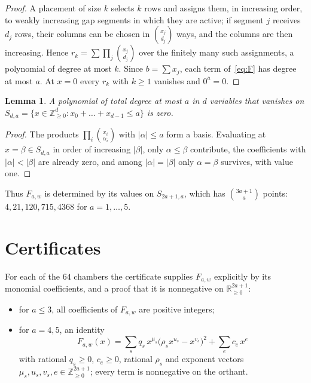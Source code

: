 \documentclass[11pt]{article}
\newtheorem{lemma}[theorem]{Lemma}
\theoremstyle{definition}
\theoremstyle{remark}
\newcommand{\rise}[2]{#1^{\overline{#2}}}
\begin{document}
\begin{proof}
A placement of size $k$ selects $k$ rows and assigns them, in increasing
order, to weakly increasing gap segments in which they are active; if
segment $j$ receives $d_j$ rows, their columns can be chosen in
$\binom{x_j}{d_j}$ ways, and the columns are then increasing. Hence
$r_k=\sum\prod_j\binom{x_j}{d_j}$ over the finitely many such
assignments, a polynomial of degree at most $k$. Since $b=\sum x_j$,
each term of~\eqref{eq:F} has degree at most $a$. At $x=0$ every $r_k$
with $k\ge1$ vanishes and $\rise 0a=0$.
\end{proof}

\begin{lemma}\label{lem:det}
A polynomial of total degree at most $a$ in $d$ variables that vanishes on
$S_{d,a}=\{x\in\mathbb Z_{\ge0}^d:x_0+\dots+x_{d-1}\le a\}$ is zero.
\end{lemma}

\begin{proof}
The products $\prod_i\binom{x_i}{\alpha_i}$ with $|\alpha|\le a$ form a
basis. Evaluating at $x=\beta\in S_{d,a}$ in order of increasing
$|\beta|$, only $\alpha\le\beta$ contribute, the coefficients with
$|\alpha|<|\beta|$ are already zero, and among $|\alpha|=|\beta|$ only
$\alpha=\beta$ survives, with value one.
\end{proof}

Thus $F_{a,w}$ is determined by its values on $S_{2a+1,a}$, which has
$\binom{3a+1}{a}$ points: $4,21,120,715,4368$ for $a=1,\dots,5$.

\section{Certificates}\label{sec:cert}

For each of the $64$ chambers the certificate supplies $F_{a,w}$
explicitly by its monomial coefficients, and a proof that it is
nonnegative on $\mathbb R_{\ge0}^{2a+1}$:
\begin{itemize}
\item for $a\le3$, all coefficients of $F_{a,w}$ are positive integers;
\item for $a=4,5$, an identity
\begin{equation}\label{eq:sos}
F_{a,w}(x)=\sum_s q_s\,x^{\mu_s}\bigl(\rho_s x^{u_s}-x^{v_s}\bigr)^2+\sum_e c_e\,x^e
\end{equation}
with rational $q_s\ge0$, $c_e\ge0$, rational $\rho_s$ and exponent vectors
$\mu_s,u_s,v_s,e\in\mathbb Z_{\ge0}^{2a+1}$; every term is nonnegative on
the orthant.
\end{itemize}
\end{document}
